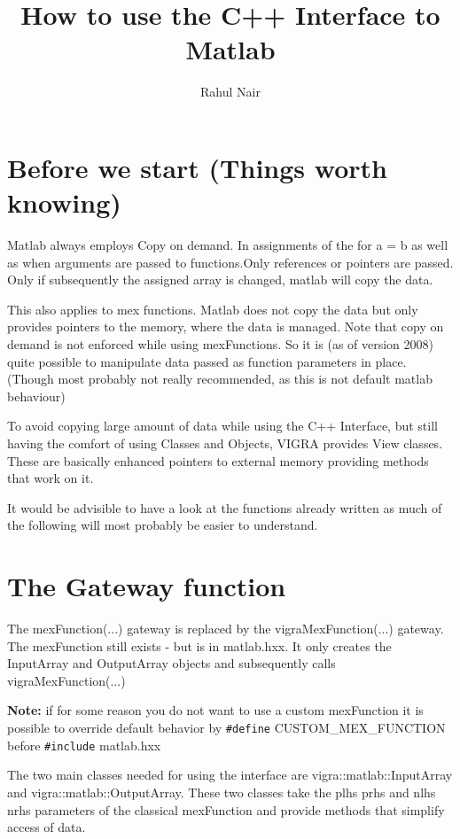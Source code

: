 \documentclass[a4paper,10pt]{article}
\title{How to use the C++ Interface to Matlab}
\author{Rahul Nair}
\begin{document}
\maketitle



\section{Before we start (Things worth knowing)}
Matlab always employs Copy on demand. In assignments of the for a = b as well as when arguments are passed to functions.Only references or pointers are passed. Only if subsequently the assigned array is changed, matlab will copy the data.

This also applies to mex functions. Matlab does not copy the data but only provides pointers to the memory, where the data is managed. Note that copy on demand is not enforced while using mexFunctions. So it is (as of version 2008) quite possible to manipulate data passed as function parameters in place. (Though most probably not really recommended, as this is not default matlab behaviour)


To avoid copying large amount of data while using the C++ Interface, but still having the comfort of using Classes and Objects, VIGRA provides View classes. These are basically enhanced pointers to external memory providing methods that work on it.

It would be advisible to have a look at the functions already written as much of the following will most probably be
easier to understand.

\section{The Gateway function}
The mexFunction(...) gateway is replaced by the vigraMexFunction(...) gateway. The mexFunction still exists - but is in matlab.hxx. It only creates the InputArray and OutputArray objects and subsequently calls vigraMexFunction(...)

\textbf{Note:} if for some reason you do not want to use a custom mexFunction it is possible to override default behavior by \verb+#define+ CUSTOM\_MEX\_FUNCTION before \verb+#include+ matlab.hxx

The two main classes needed for using the interface are vigra::matlab::InputArray and vigra::matlab::OutputArray.
These two classes take the plhs prhs and nlhs nrhs parameters of the classical mexFunction and provide methods that simplify access of data.
\end{document}
